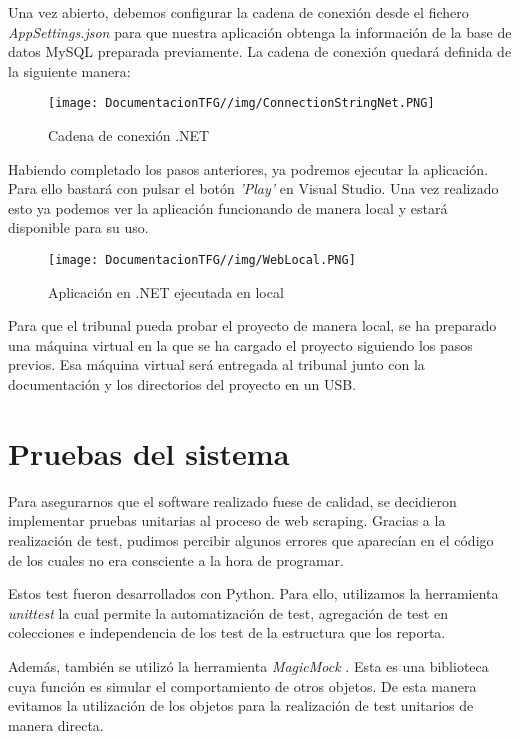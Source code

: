 Una vez abierto, debemos configurar la cadena de conexión desde el fichero \textit{AppSettings.json} para que nuestra aplicación obtenga la información de la base de datos MySQL preparada previamente. La cadena de conexión quedará definida de la siguiente manera:

\begin{figure}[H]
    \centering
    \texttt{[image: DocumentacionTFG//img/ConnectionStringNet.PNG]}
    \caption{Cadena de conexión .NET}
\end{figure}

Habiendo completado los pasos anteriores, ya podremos ejecutar la aplicación. Para ello bastará con pulsar el botón \textit{'Play'} en Visual Studio. Una vez realizado esto ya podemos ver la aplicación funcionando de manera local y estará disponible para su uso.

\begin{figure}[H]
    \centering
    \texttt{[image: DocumentacionTFG//img/WebLocal.PNG]}
    \caption{Aplicación en .NET ejecutada en local}
\end{figure}

Para que el tribunal pueda probar el proyecto de manera local, se ha preparado una máquina virtual en la que se ha cargado el proyecto siguiendo los pasos previos. Esa máquina virtual será entregada al tribunal junto con la documentación y los directorios del proyecto en un USB.

\section{Pruebas del sistema}
Para asegurarnos que el software realizado fuese de calidad, se decidieron implementar pruebas unitarias al proceso de web scraping. Gracias a la realización de test, pudimos percibir algunos errores que aparecían en el código de los cuales no era consciente a la hora de programar. 

Estos test fueron desarrollados con Python. Para ello, utilizamos la herramienta \textit{unittest} la cual permite la automatización de test, agregación de test en colecciones e independencia de los test de la estructura que los reporta.

Además, también se utilizó la herramienta  \textit{MagicMock} \cite{mock:latex}. Esta es una biblioteca cuya función es simular el comportamiento de otros objetos. De esta manera evitamos la utilización de los objetos para la realización de test unitarios de manera directa.

